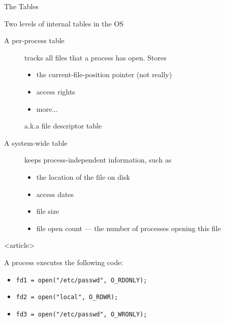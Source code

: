\begin{frame}{The Tables}%
  \begin{block}{Two levels of internal tables in the OS}
    \begin{description}
      \item[A per-process table] tracks all files that a process has open. Stores
        \begin{itemize}
        \item the current-file-position pointer (not really)
        \item access rights
        \item more...
        \end{itemize}
        a.k.a file descriptor table
      \item[A system-wide table] keeps process-independent information, such as
        \begin{itemize}
        \item the location of the file on disk
        \item access dates
        \item file size
        \item file open count --- the number of processes opening this file
        \end{itemize}
    \end{description}    
  \end{block}  
\end{frame}

\begin{frame}<article>%
  \begin{center}
  \end{center}
\end{frame}

\begin{frame}
  \begin{block}{A process executes the following code:}
    \begin{itemize}
    \item[] \texttt{fd1 = open("/etc/passwd", O\_RDONLY);}
    \item[] \texttt{fd2 = open("local", O\_RDWR);}
    \item[] \texttt{fd3 = open("/etc/passwd", O\_WRONLY);}
    \end{itemize}
  \end{block}
  \begin{center}
  \end{center}
\end{frame}

